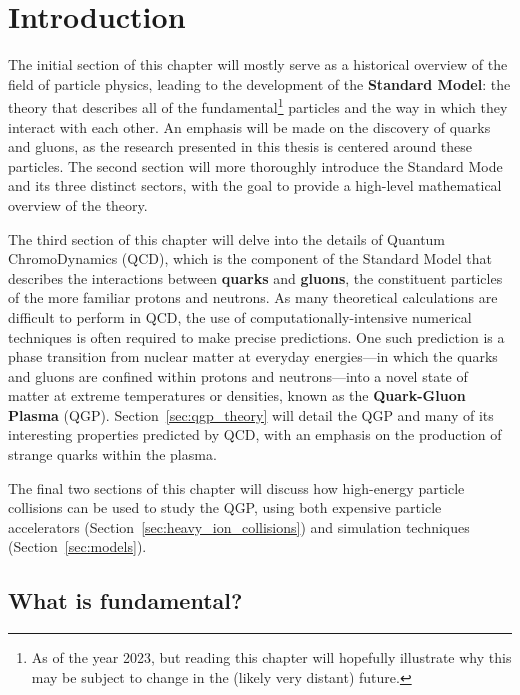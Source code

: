 \chapter{Introduction}
\label{ch:introduction}

The initial section of this chapter will mostly serve as a historical overview of the field of particle physics, leading to the development of the \textbf{Standard Model}: the theory that describes all of the fundamental\footnote{As of the year 2023, but reading this chapter will hopefully illustrate why this may be subject to change in the (likely very distant) future.} particles and the way in which they interact with each other. An emphasis will be made on the discovery of quarks and gluons, as the research presented in this thesis is centered around these particles. The second section will more thoroughly introduce the Standard Mode and its three distinct sectors, with the goal to provide a high-level mathematical overview of the theory.

The third section of this chapter will delve into the details of Quantum ChromoDynamics (QCD), which is the component of the Standard Model that describes the interactions between \textbf{quarks} and \textbf{gluons}, the constituent particles of the more familiar protons and neutrons. As many theoretical calculations are difficult to perform in QCD, the use of computationally-intensive numerical techniques is often required to make precise predictions. One such prediction is a phase transition from nuclear matter at everyday energies---in which the quarks and gluons are confined within protons and neutrons---into a novel state of matter at extreme temperatures or densities, known as the \textbf{Quark-Gluon Plasma} (QGP). Section~\ref{sec:qgp_theory} will detail the QGP and many of its interesting properties predicted by QCD, with an emphasis on the production of strange quarks within the plasma.

The final two sections of this chapter will discuss how high-energy particle collisions can be used to study the QGP, using both expensive particle accelerators (Section~\ref{sec:heavy_ion_collisions}) and simulation techniques (Section~\ref{sec:models}). 

\clearpage

\section{What is fundamental?}
\label{sec:fundamental}

